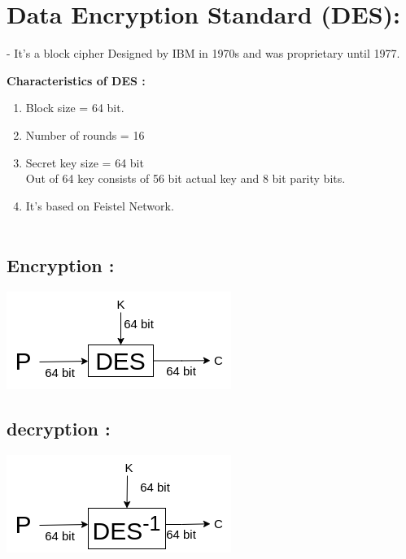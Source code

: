 \documentclass[11pt]{article}
\begin{document}
\newpage

\section{Data Encryption Standard (DES): }
- It's a block cipher Designed by IBM in 1970s and was proprietary until 1977.

\textbf{Characteristics of DES :}
\begin{enumerate}
    \item Block size = 64 bit.
    \item Number of rounds = 16
    \item Secret key size = 64 bit \\
    Out of 64 key consists of 56 bit actual key and 8 bit parity bits.
    \item It's based on Feistel Network.\\\\
\end{enumerate}

\begin{multicols}{2}
\subsection{Encryption :}
\includegraphics{Images/L_5-6/DES-Enc-Dec.drawio.png}
\columnbreak
\subsection{decryption :}
\includegraphics[scale=0.95]{Images/L_5-6/DES-Enc-Dec.drawio (1).png}
\end{multicols}
\end{document}
